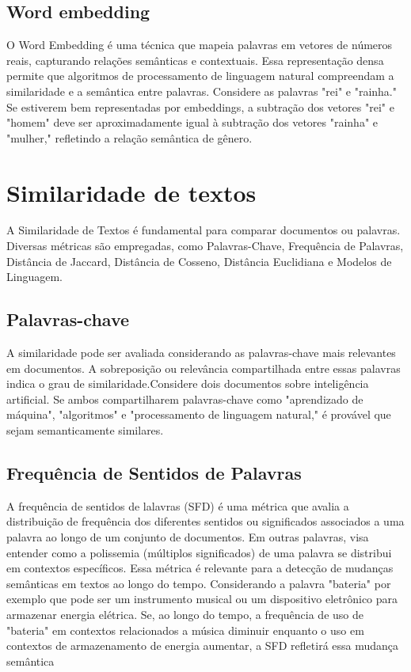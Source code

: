 \subsection{Word embedding}
O Word Embedding é uma técnica que mapeia palavras em vetores de números reais, capturando relações semânticas e contextuais. Essa representação densa permite que algoritmos de processamento de linguagem natural compreendam a similaridade e a semântica entre palavras. Considere as palavras "rei" e "rainha." Se estiverem bem representadas por embeddings, a subtração dos vetores "rei" e "homem" deve ser aproximadamente igual à subtração dos vetores "rainha" e "mulher," refletindo a relação semântica de gênero.

\section{Similaridade de textos}
A Similaridade de Textos é fundamental para comparar documentos ou palavras. Diversas métricas são empregadas, como Palavras-Chave, Frequência de Palavras, Distância de Jaccard, Distância de Cosseno, Distância Euclidiana e Modelos de Linguagem.

\subsection{Palavras-chave}
A similaridade pode ser avaliada considerando as palavras-chave mais relevantes em documentos. A sobreposição ou relevância compartilhada entre essas palavras indica o grau de similaridade.Considere dois documentos sobre inteligência artificial. Se ambos compartilharem palavras-chave como "aprendizado de máquina", "algoritmos" e "processamento de linguagem natural," é provável que sejam semanticamente similares.

\subsection{Frequência de Sentidos de Palavras}

A frequência de sentidos de lalavras (SFD) é uma métrica que avalia a distribuição de frequência dos diferentes sentidos ou significados associados a uma palavra ao longo de um conjunto de documentos. Em outras palavras, visa entender como a polissemia (múltiplos significados) de uma palavra se distribui em contextos específicos. Essa métrica é relevante para a detecção de mudanças semânticas em textos ao longo do tempo. Considerando a palavra "bateria" por exemplo que pode ser um instrumento musical ou um dispositivo eletrônico para armazenar energia elétrica. Se, ao longo do tempo, a frequência de uso de "bateria" em contextos relacionados a música diminuir enquanto o uso em contextos de armazenamento de energia aumentar, a SFD refletirá essa mudança semântica


